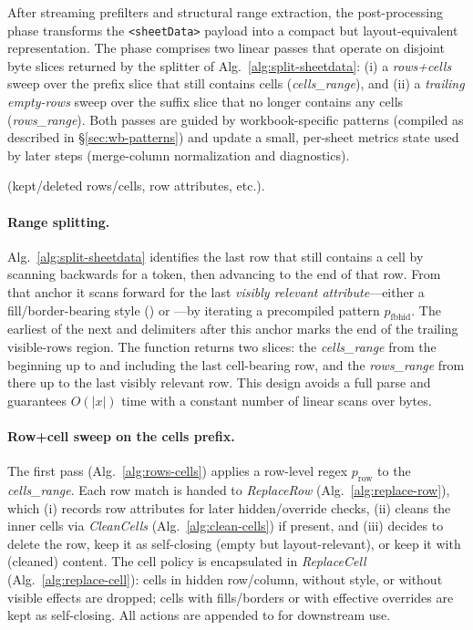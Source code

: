 \noindent
After streaming prefilters and structural range extraction, the post-processing
phase transforms the \texttt{<sheetData>} payload into a compact but
layout-equivalent representation. The phase comprises two linear passes that
operate on disjoint byte slices returned by the splitter of
Alg.~\ref{alg:split-sheetdata}:
(i) a \emph{rows+cells} sweep over the prefix slice that still contains cells
(\emph{cells\_range}), and (ii) a \emph{trailing empty-rows} sweep over the
suffix slice that no longer contains any cells (\emph{rows\_range}).
Both passes are guided by workbook-specific patterns (compiled as described in
\S\ref{sec:wb-patterns}) and update a small, per-sheet metrics state used by later
steps (merge-column normalization and diagnostics).



 (kept/deleted rows/cells, row attributes, etc.).


\paragraph*{Range splitting.}

Alg.~\ref{alg:split-sheetdata} identifies the last row that still contains a
cell by scanning backwards for a  token, then advancing to the
end of that row. From that anchor it scans forward for the last
\emph{visibly relevant attribute}---either a fill/border-bearing style
() or ---by iterating a precompiled pattern
\mbox{$p_{\mathrm{fbhid}}$}. The earliest of the next
 and \xtag{/>} delimiters after this anchor marks the end of the
trailing visible-rows region. The function returns two slices: the \emph{cells_range} from the beginning up to and including
the last cell-bearing row, and the \emph{rows_range} from there up to the last
visibly relevant row. This design avoids a full parse and guarantees
$O(|x|)$ time with a constant number of linear scans over bytes.

\paragraph*{Row+cell sweep on the cells prefix.}
The first pass (Alg.~\ref{alg:rows-cells}) applies a row-level regex
\mbox{$p_{\text{row}}$} to the \emph{cells\_range}. Each row match is handed to
\emph{ReplaceRow} (Alg.~\ref{alg:replace-row}), which (i) records row
attributes for later hidden/override checks, (ii) cleans the inner
cells via \emph{CleanCells} (Alg.~\ref{alg:clean-cells}) if present,
and (iii) decides to delete the row, keep it as self-closing (empty but
layout-relevant), or keep it with (cleaned) content. The cell
policy is encapsulated in \emph{ReplaceCell} (Alg.~\ref{alg:replace-cell}):
cells in hidden row/column, without style, or without visible effects are
dropped; cells with fills/borders or with effective overrides are kept as
self-closing. All actions are appended to  for downstream use.



